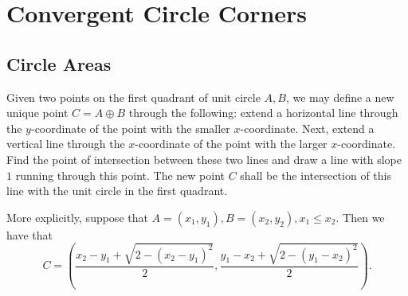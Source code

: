 \documentclass{article}
\begin{document}
\section*{Convergent Circle Corners}

\subsection*{Circle Areas}

Given two points on the first quadrant of unit circle \( A, B \), we may define
a new unique point \( C = A \oplus B \) through the following: extend a
horizontal line through the \( y \)-coordinate of the point with the smaller \(
x \)-coordinate. Next, extend a vertical line through the \( x \)-coordinate of
the point with the larger \( x \)-coordinate. Find the point of intersection
between these two lines and draw a line with slope \( 1 \) running through this
point. The new point \( C \) shall be the intersection of this line with the
unit circle in the first quadrant.

More explicitly, suppose that \( A = \left( x_1, y_1 \right), B = \left( x_2,
y_2 \right), x_1 \leqslant x_2 \). Then we have that
\[
    C = \left( \frac{x_2 - y_1 + \sqrt{2 - \left( x_2 - y_1 \right)^2}}{2}, \frac{y_1 - x_2 + \sqrt{2 - \left( y_1 - x_2 \right)^2}}{2} \right)
.\]

\begin{center}
\end{center}
\end{document}
